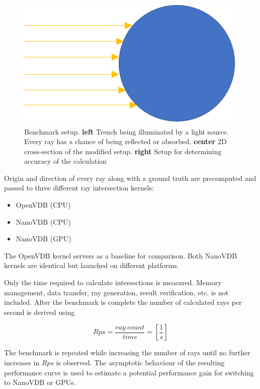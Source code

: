 \begin{figure}[!htb]
	\endminipage\hfill
	  \includegraphics[width=\linewidth]{res/rays_on_sphere.png}
	\endminipage

		\caption{Benchmark setup. 
		\textbf{left} Trench being illuminated by a light source. Every ray has a chance of being reflected or absorbed.
		\textbf{center} 2D cross-section of the modified setup. 
		\textbf{right} Setup for determining accuracy of the calculation
		}
	\label{fig:benchmark_setup}
\end{figure}


Origin and direction of every ray along with a ground truth are precomputed and passed to three different ray intersection kernels:

\begin{itemize}
	\item OpenVDB (CPU)
	\item NanoVDB (CPU)
	\item NanoVDB (GPU)
\end{itemize}

The OpenVDB kernel servers as a baseline for comparison.
Both NanoVDB kernels are identical but launched on different platforms.

Only the time required to calculate intersections is measured. Memory management, data transfer, ray generation, result verification, etc. is not included.
After the benchmark is complete the number of calculated rays per second is derived using

\begin{equation}
	Rps = \frac{ray \: count}{time} = [\frac{1}{s}]
\end{equation}

The benchmark is repeated while increasing the number of rays until no further increases in $Rps$ is observed.
The asymptotic behaviour of the resulting performance curve is used to estimate a potential performance gain for switching to NanoVDB or GPUs.

